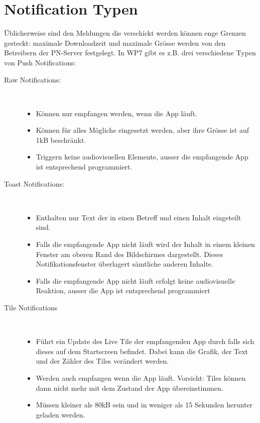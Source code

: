 \documentclass[a4paper,10pt]{scrreprt}
\begin{document}
\section{Notification Typen}
Üblicherweise sind den Meldungen die verschickt werden können enge Grenzen gesteckt: maximale
Downloadzeit und maximale Grösse werden von den Betreibern der PN-Server festgelegt. In WP7 gibt es z.B.
drei verschiedene Typen von Push Notifications:
\begin{description}


 \item [Raw Notifications:] \hfill \\
 \begin{itemize}
\item Können nur empfangen werden, wenn die App läuft.
\item Können für alles Mögliche eingesetzt werden, aber ihre Grösse ist auf 1kB beschränkt.
\item Triggern keine audiovisuellen Elemente, ausser die empfangende App ist entsprechend programmiert.
 \end{itemize}
\item[Toast Notifications:] \hfill \\
\begin{itemize}
\item Enthalten nur Text der in einen Betreff und einen Inhalt
eingeteilt sind.
\item Falls die empfangende App nicht läuft wird der Inhalt in
einem kleinen Fenster am oberen Rand des
Bildschirmes dargestellt. Dieses Notifikationsfenster
überlagert sämtliche anderen Inhalte.
\item Falls die empfangende App nicht läuft erfolgt keine
audiovisuelle Reaktion, ausser die App ist entsprechend
programmiert
\end{itemize}
\item[Tile Notifications] \hfill \\
\begin{itemize}
\item Führt ein Update des Live Tile der empfangenden App durch falls sich dieses auf dem Startscreen
befindet. Dabei kann die Grafik, der Text und der Zähler des Tiles verändert werden.
\item Werden auch empfangen wenn die App läuft. Vorsicht: Tiles können dann nicht mehr mit dem Zustand
der App übereinstimmen.
\item Müssen kleiner als 80kB sein und in weniger als 15 Sekunden herunter geladen werden.
\end{itemize}
\end{description}
\end{document}

